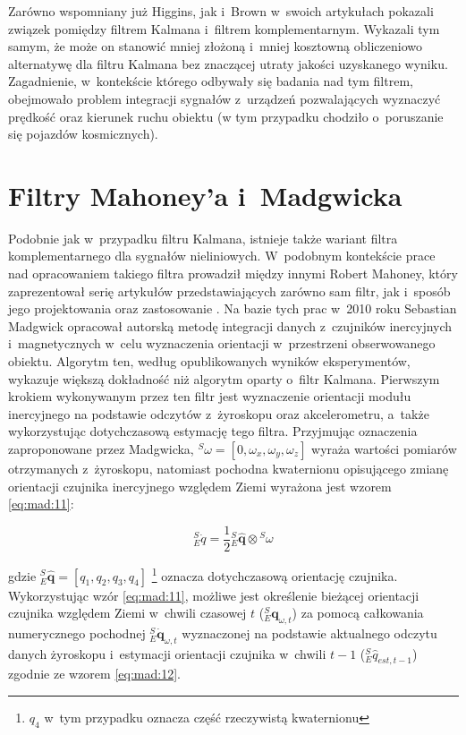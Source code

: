 Zarówno wspomniany już Higgins, jak i~Brown \cite{BROWN1972} w~swoich artykułach pokazali związek pomiędzy filtrem Kalmana i~filtrem komplementarnym. Wykazali tym samym, że może on stanowić mniej złożoną i~mniej kosztowną obliczeniowo alternatywę dla filtru Kalmana bez znaczącej utraty jakości uzyskanego wyniku. Zagadnienie, w~kontekście którego odbywały się badania nad tym filtrem, obejmowało problem integracji sygnałów z~urządzeń pozwalających wyznaczyć prędkość oraz kierunek ruchu obiektu (w tym przypadku chodziło o~poruszanie się pojazdów kosmicznych).
\section*{Filtry Mahoney'a i~Madgwicka}
Podobnie jak w~przypadku filtru Kalmana, istnieje także wariant filtra komplementarnego dla sygnałów nieliniowych. W~podobnym kontekście prace nad opracowaniem takiego filtra prowadził między innymi Robert Mahoney, który zaprezentował serię artykułów przedstawiających zarówno sam filtr, jak i~sposób jego projektowania oraz zastosowanie \cite{Baldwin2007,Mahony2005a,Mahony2008,Euston2008}. 
Na bazie tych prac w~2010 roku Sebastian Madgwick opracował autorską metodę \cite{Madgwick2010,Madgwick2011} integracji danych z~czujników inercyjnych i~magnetycznych w~celu wyznaczenia orientacji w~przestrzeni obserwowanego obiektu. Algorytm ten, według opublikowanych wyników eksperymentów, wykazuje większą dokładność niż algorytm oparty o~filtr Kalmana.
Pierwszym krokiem wykonywanym przez ten filtr jest wyznaczenie orientacji modułu inercyjnego na podstawie odczytów z~żyroskopu oraz akcelerometru, a~także wykorzystując dotychczasową estymację tego filtra. Przyjmując oznaczenia zaproponowane przez Madgwicka, $^S \omega = [0,\omega_x,\omega_y,\omega_z]$ wyraża wartości pomiarów otrzymanych z~żyroskopu, natomiast pochodna kwaternionu opisującego zmianę orientacji czujnika inercyjnego względem Ziemi wyrażona jest wzorem \ref{eq:mad:11}:

\begin{equation}
	{^S_E \dot{q}} = \frac{1}{2}{^S_E \hat{\mathbf{q}}}\otimes {^S{\omega}}
	\label{eq:mad:11}
\end{equation}

gdzie ${^S_E \hat{\mathbf{q}} = [q_1,q_2,q_3,q_4]}$ \footnote{$q_4$ w~tym przypadku oznacza część rzeczywistą kwaternionu} oznacza dotychczasową orientację czujnika. Wykorzystując wzór \ref{eq:mad:11}, możliwe jest określenie bieżącej orientacji czujnika względem Ziemi w~chwili czasowej $t$ ($^S_E{\mathbf{q}}_{\omega,t}$) za pomocą całkowania numerycznego pochodnej $^S_E\dot{\mathbf{q}}_{\omega,t}$ wyznaczonej na podstawie aktualnego odczytu danych żyroskopu i~estymacji orientacji czujnika w~chwili $t-1$ (${^S_E \hat{q}_{est, t-1}}$) zgodnie ze wzorem \ref{eq:mad:12}.

